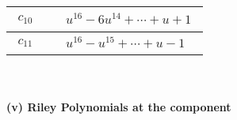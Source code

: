 \documentclass[1p]{elsarticle_modified}
\theoremstyle{definition}
\begin{document}
\begin{tabular}{m{50pt}|m{274pt}}
\hline $$\begin{aligned}c_{10}\end{aligned}$$&$\begin{aligned}
&u^{16}-6 u^{14}+\cdots+u+1
\end{aligned}$\\
\hline $$\begin{aligned}c_{11}\end{aligned}$$&$\begin{aligned}
&u^{16}- u^{15}+\cdots+u-1
\end{aligned}$\\
\hline
\end{tabular}\\~\\
\newpage\renewcommand{\arraystretch}{1}
\flushleft \textbf{(v) Riley Polynomials at the component}\newline \\
\end{document}
